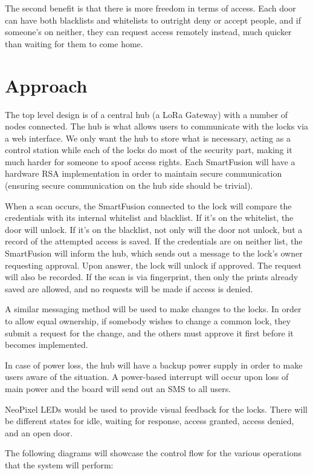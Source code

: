 \documentclass{article}
\begin{document}
The second benefit is that there is more freedom in terms of access. Each door
can have both blacklists and whitelists to outright deny or accept people, and
if someone's on neither, they can request access remotely instead, much quicker
than waiting for them to come home. 

\section{Approach}

The top level design is of a central hub (a LoRa Gateway) with a number of nodes connected. The
hub is what allows users to communicate with the locks via a web interface. We
only want the hub to store what is necessary, acting as a control station while
each of the locks do most of the security part, making it much harder for
someone to spoof access rights. Each SmartFusion will have a hardware RSA
implementation in order to maintain secure communication (ensuring secure
communication on the hub side should be trivial).

When a scan occurs, the SmartFusion connected to the lock will compare the
credentials with its internal whitelist
and blacklist. If it's on the whitelist, the door will unlock. If it's on the
blacklist, not only will the door not unlock, but a record of the attempted
access is saved. If the credentials are on neither list, the SmartFusion will inform the hub,
which sends out a message to the lock's owner requesting approval. Upon
answer, the lock will unlock if approved. The request will also be recorded. If
the scan is via fingerprint, then only the prints already saved are allowed, and
no requests will be made if access is denied.

A similar messaging method will be used to make changes to the locks. In
order to allow equal ownership, if somebody wishes to change a common lock, they
submit a request for the change, and the others must approve it first before it
becomes implemented.

In case of power loss, the hub will have a backup power supply in order to
make users aware of the situation. A power-based interrupt will occur upon loss
of main power and the board will send out an SMS to all users.

NeoPixel LEDs would be used to provide visual feedback for the locks. There will
be different states for idle, waiting for response, access granted, access
denied, and an open door.

The following diagrams will showcase the control flow for the various operations
that the system will perform:
\end{document}

